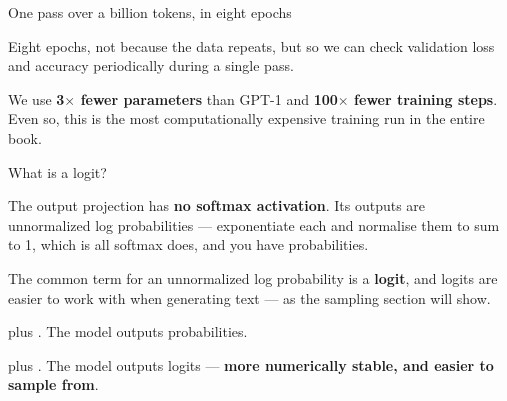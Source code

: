 \documentclass[aspectratio=169,11pt,t]{beamer}
\begin{document}
\begin{frame}[shrink=25]{One pass over a billion tokens, in eight epochs}
{\fontsize{9.4}{12.6}\selectfont\color{fg2}Eight epochs, not because the data repeats, but so we can check validation loss and accuracy periodically during a single pass.\par}\vskip 4pt
{\fontsize{9.4}{12.6}\selectfont\color{fg2}We use \textbf{3$\times$ fewer parameters} than GPT-1 and \textbf{100$\times$ fewer training steps}. Even so, this is the most computationally expensive training run in the entire book.\par}\vskip 4pt
\end{frame}

\begin{frame}[shrink=25]{What is a logit?}
{\fontsize{9.4}{12.6}\selectfont\color{fg2}The output projection has \textbf{no softmax activation}. Its outputs are unnormalized log probabilities --- exponentiate each and normalise them to sum to 1, which is all softmax does, and you have probabilities.\par}\vskip 4pt
{\fontsize{9.4}{12.6}\selectfont\color{fg2}The common term for an unnormalized log probability is a \textbf{logit}, and logits are easier to work with when generating text --- as the sampling section will show.\par}\vskip 4pt
\begin{minipage}[t]{0.494\textwidth}
\begin{icard}
 plus . The model outputs probabilities.
\end{icard}
\end{minipage}%
\hfill
\begin{minipage}[t]{0.494\textwidth}
\begin{icardaccent}
 plus . The model outputs logits --- \textbf{more numerically stable, and easier to sample from}.
\end{icardaccent}
\end{minipage}%
\end{frame}
\end{document}
